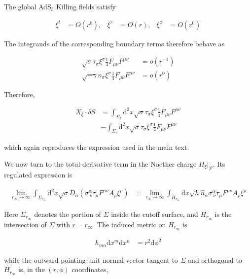 The global AdS$_3$ Killing fields satisfy

\begin{align}
\xi ^{t} & =O(r^{0}), & \xi ^{r} & =O(r), & \xi ^{\phi} & =O(r^{0})
\end{align}

The integrands of the corresponding boundary terms therefore behave as

\begin{align}
\sqrt{ \sigma }\tau _{\sigma}\xi ^{\sigma}\frac{1}{4}F_{\mu \nu}F^{\mu \nu} & =o(r^{-1}) \\
\sqrt{ -\gamma }n_{\sigma}\xi ^{\sigma}\frac{1}{4}F_{\mu \nu}F^{\mu \nu} & =o(r^{0})
\end{align}

Therefore,

\begin{align}
X_{\xi}\cdot \delta S & =\int _{\Sigma _{f}}\mathrm{d}^{2}x\sqrt{ \sigma }\tau _{\sigma}\xi ^{\sigma}\frac{1}{4}F_{\mu \nu}F^{\mu \nu} \\
 & -\int _{\Sigma _{i}}\mathrm{d}^{2}x\sqrt{ \sigma }\tau _{\sigma}\xi ^{\sigma}\frac{1}{4}F_{\mu \nu}F^{\mu \nu}
\end{align}

which again reproduces the expression used in the main text.

We now turn to the total-derivative term in the Noether charge $H_{\xi}|_{\widetilde{\mathcal{P}}}$. Its regulated expression is

\begin{align}
\lim_{ r_{\infty} \to \infty }\int _{\Sigma _{r_{\infty}}}\mathrm{d}^{2}x\sqrt{ \sigma }D_{\alpha}\left(\sigma ^{\alpha}_{~\nu}\tau _{\mu}F^{\mu \nu}A_{\rho}\xi ^{\rho}\right)
&=\lim_{ r_{\infty} \to \infty }\int _{H_{r_{\infty}}}\mathrm{d}x\sqrt{ h }\hat{n}_{\alpha}\sigma ^{\alpha}_{~\nu}\tau _{\mu}F^{\mu \nu}A_{\rho}\xi ^{\rho}
\end{align}

Here $\Sigma _{r_{\infty}}$ denotes the portion of $\Sigma$ inside the cutoff surface, and $H_{r_{\infty}}$ is the intersection of $\Sigma$ with $r=r_{\infty}$. The induced metric on $H_{r_{\infty}}$ is

\begin{align}
h_{mn}\mathrm{d}x^{m}\mathrm{d}x^{n} & =r^{2}\mathrm{d}\phi ^{2}
\end{align}

while the outward-pointing unit normal vector tangent to $\Sigma$ and orthogonal to $H_{r_{\infty}}$ is, in the $(r,\phi)$ coordinates,

